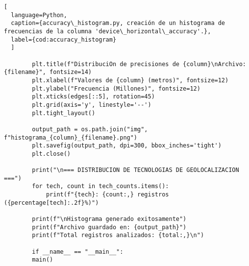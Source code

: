 \begin{lstlisting}[
  language=Python,
  caption={accuracy\_histogram.py, creación de un histograma de frecuencias de la columna 'device\_horizontal\_accuracy'.},
  label={cod:accuracy_histogram}
  ]
        
        plt.title(f"DistribuciOn de precisiones de {column}\nArchivo: {filename}", fontsize=14)
        plt.xlabel(f"Valores de {column} (metros)", fontsize=12)
        plt.ylabel("Frecuencia (Millones)", fontsize=12)
        plt.xticks(edges[::5], rotation=45)
        plt.grid(axis='y', linestyle='--')
        plt.tight_layout()

        output_path = os.path.join("img", f"histograma_{column}_{filename}.png")
        plt.savefig(output_path, dpi=300, bbox_inches='tight')
        plt.close()
        
        print("\n=== DISTRIBUCION DE TECNOLOGIAS DE GEOLOCALIZACION ===")
        for tech, count in tech_counts.items():
            print(f"{tech}: {count:,} registros ({percentage[tech]:.2f}%)")
        
        print(f"\nHistograma generado exitosamente")
        print(f"Archivo guardado en: {output_path}")
        print(f"Total registros analizados: {total:,}\n")

        if __name__ == "__main__":
        main()
\end{lstlisting}
\vfill

